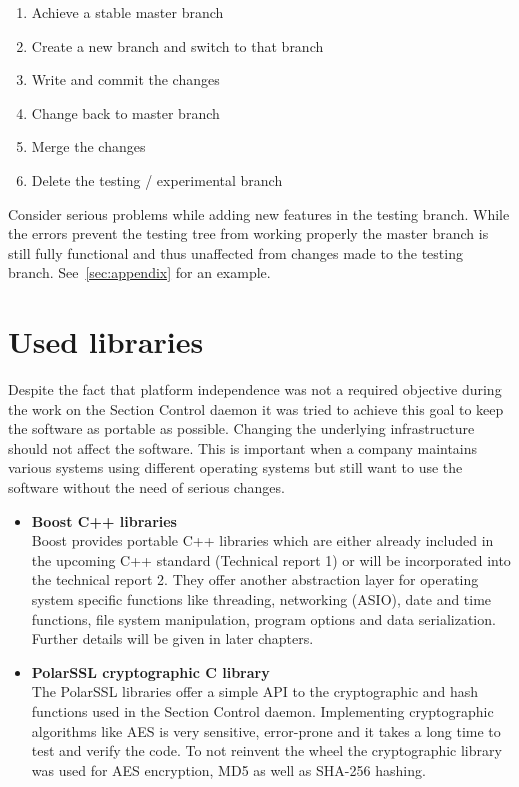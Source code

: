 \documentclass[oneside,bachelor,etd]{BYUPhys}
\begin{document}
\begin{enumerate}
	\item Achieve a stable master branch
	\item Create a new branch and switch to that branch
	\item Write and commit the changes
	\item Change back to master branch
	\item Merge the changes
	\item Delete the testing / experimental branch
\end{enumerate}

Consider serious problems while adding new features in the testing branch. While the errors prevent the testing tree from working properly
the master branch is still fully functional and thus unaffected from changes made to the testing branch.
See~\ref{sec:appendix} for an example.


\section{Used libraries}
\label{sec:2libs}

Despite the fact that platform independence was not a required objective during the work on the Section Control daemon it
was tried to achieve this goal to keep the software as portable as possible. Changing the underlying infrastructure should
not affect the software. This is important when a company maintains various systems using different operating systems but 
still want to use the software without the need of serious changes.

\begin{itemize}
	\item \textbf{Boost C++ libraries} \hfill \\
		Boost provides portable C++ libraries which are either already included in the upcoming C++ standard (Technical report 1) or will be incorporated into the technical report 2.
		They offer another abstraction layer for operating system specific functions like threading, networking (ASIO), date and time functions, file system manipulation, program options 			and data serialization. Further details will be given in later chapters.
	\item \textbf{PolarSSL cryptographic C library} \hfill \\
		The PolarSSL libraries offer a simple API to the cryptographic and hash functions used in the Section Control daemon. Implementing cryptographic algorithms like AES is very 					sensitive, error-prone and it takes a long time to test and verify the code. To not reinvent the wheel the cryptographic library was used for AES encryption, MD5 as well as SHA-256 			hashing.
\end{itemize}
\end{document}
